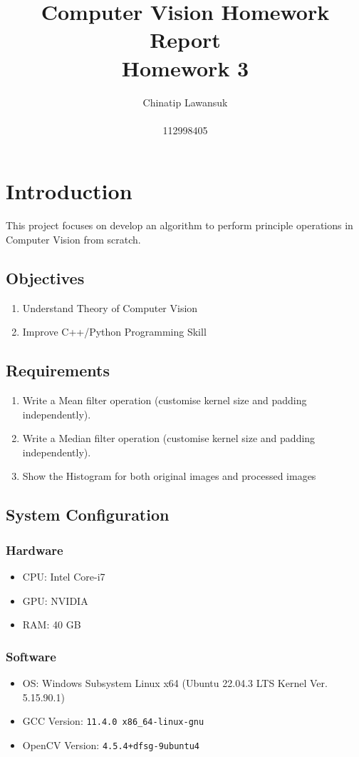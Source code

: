 \documentclass[12pt,a4paper]{report}
\title{Computer Vision Homework Report \\ \Large Homework 3}
\author{Chinatip Lawansuk\\\\112998405}
\date{}
\begin{document}
\maketitle

\tableofcontents

\chapter{Introduction}
This project focuses on develop an algorithm to perform principle operations in Computer Vision from scratch.

\section{Objectives}
\begin{enumerate}
  \item Understand Theory of Computer Vision
  \item Improve C++/Python Programming Skill
\end{enumerate}

\section{Requirements}
\begin{enumerate}
  \item Write a Mean filter operation (customise kernel size and padding independently).
  \item Write a Median filter operation (customise kernel size and padding independently).
  \item Show the Histogram for both original images and processed images
\end{enumerate}

\section{System Configuration}
\subsection{Hardware}
\begin{itemize}
  \item CPU\@: Intel Core-i7
  \item GPU\@: NVIDIA
  \item RAM\@: 40 GB
\end{itemize}

\subsection{Software}
\begin{itemize}
  \item OS\@: Windows Subsystem Linux x64 (Ubuntu 22.04.3 LTS Kernel Ver. 5.15.90.1)
  \item GCC Version\@: \verb|11.4.0 x86_64-linux-gnu|
  \item OpenCV Version\@: \verb|4.5.4+dfsg-9ubuntu4|
\end{itemize}
\end{document}
